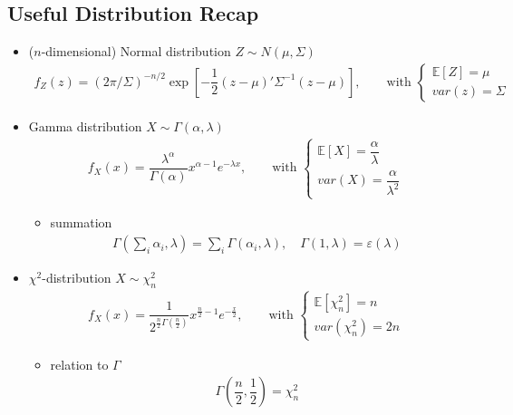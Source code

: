 \subsection{Useful Distribution Recap}
\begin{itemize}[topsep=2pt,itemsep=0pt]
    \item ($ n $-dimensional) Normal distribution $ Z\sim N(\mu ,\Sigma ) $
    \begin{align*}
        f_Z(z)=(2\pi/\Sigma)^{-n/2} \exp\left[ -\dfrac{1}{2}(z-\mu )'\Sigma ^{-1}(z-\mu ) \right],\qquad \text{with }\begin{cases}
            \mathbb{E}\left[ Z \right]=\mu\\
            var(z)=\Sigma  
        \end{cases} 
    \end{align*}   
    
    
    
    \item Gamma distribution $ X\sim \Gamma (\alpha ,\lambda ) $
    \begin{align*}
         f_X(x)=\dfrac{\lambda ^\alpha }{\Gamma (\alpha )}x^{\alpha -1}e^{-\lambda x},\qquad \text{with }  \begin{cases}
            \mathbb{E}\left[ X \right] =\dfrac{\alpha }{\lambda }\\
            var(X)=\dfrac{\alpha }{\lambda ^2} 
         \end{cases}  
    \end{align*}

    \begin{itemize}[topsep=2pt,itemsep=0pt]
        \item summation
        \begin{align*}
            \Gamma (\sum_{i}\alpha _i ,\lambda )=\sum_{i} \Gamma (\alpha _i,\lambda ),\quad \Gamma (1,\lambda )=\varepsilon (\lambda ) 
        \end{align*}
        
    \end{itemize}
    \item $ \chi^2 $-distribution $ X\sim \chi^2_n $
        \begin{align*}
            f_X(x)=\dfrac{1}{2^{\frac{n}{2}\Gamma (\frac{n}{2})}}x^{\frac{n}{2}-1}e^{-\frac{x}{2}} ,\qquad \text{with }  \begin{cases}
                \mathbb{E}\left[ \chi^2_n \right] =n\\
                 var(\chi^2_n)=2n 
            \end{cases}
        \end{align*}
        \begin{itemize}[topsep=2pt,itemsep=0pt]
            \item relation to $ \Gamma  $
        \begin{align*}
            \Gamma (\dfrac{n}{2},\dfrac{1}{2})=\chi^2_n 
        \end{align*}
        \end{itemize}
        

\end{itemize}
